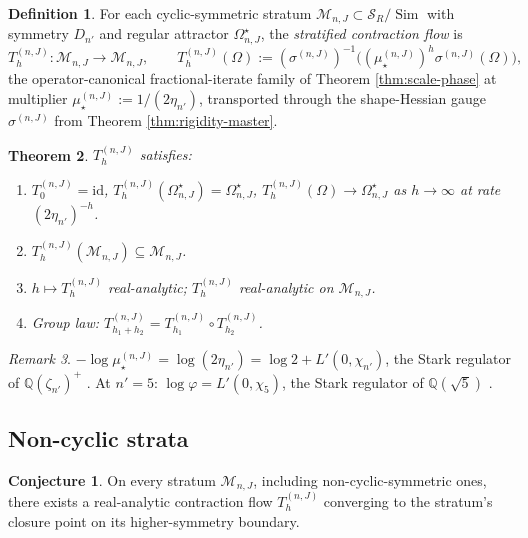\documentclass[11pt,reqno]{amsart}
\theoremstyle{plain}
\newtheorem{theorem}{Theorem}[section]
\theoremstyle{definition}
\newtheorem{definition}[theorem]{Definition}
\newtheorem*{conjecture}{Conjecture}
\theoremstyle{remark}
\newtheorem{remark}[theorem]{Remark}
\DeclareMathOperator{\Sim}{Sim}
\newcommand{\Rats}{\mathbb{Q}}
\newcommand{\Scal}{\mathcal{S}}
\newcommand{\Mcal}{\mathcal{M}}
\newcommand{\mustar}{\mu_{\star}}
\begin{document}
\begin{definition}\label{def:Th-master}
For each cyclic-symmetric stratum $\Mcal_{n,J} \subset \Scal_R/\Sim$ with symmetry $D_{n'}$ and regular attractor $\Omega^\star_{n,J}$, the \emph{stratified contraction flow} is
\[
T_h^{(n,J)} \colon \Mcal_{n,J} \to \Mcal_{n,J}, \qquad T_h^{(n,J)}(\Omega) := (\sigma^{(n,J)})^{-1}\bigl((\mustar^{(n,J)})^h \sigma^{(n,J)}(\Omega)\bigr),
\]
the operator-canonical fractional-iterate family of Theorem \ref{thm:scale-phase} at multiplier $\mustar^{(n,J)} := 1/(2\eta_{n'})$, transported through the shape-Hessian gauge $\sigma^{(n,J)}$ from Theorem \ref{thm:rigidity-master}.
\end{definition}

\begin{theorem}\label{thm:flow-master}
$T_h^{(n,J)}$ satisfies:
\begin{enumerate}
\item[\rm(i)] $T_0^{(n,J)} = \mathrm{id}$, $T_h^{(n,J)}(\Omega^\star_{n,J}) = \Omega^\star_{n,J}$, $T_h^{(n,J)}(\Omega) \to \Omega^\star_{n,J}$ as $h \to \infty$ at rate $(2\eta_{n'})^{-h}$.
\item[\rm(ii)] $T_h^{(n,J)}(\Mcal_{n,J}) \subseteq \Mcal_{n,J}$.
\item[\rm(iii)] $h \mapsto T_h^{(n,J)}$ real-analytic; $T_h^{(n,J)}$ real-analytic on $\Mcal_{n,J}$.
\item[\rm(iv)] Group law: $T_{h_1+h_2}^{(n,J)} = T_{h_1}^{(n,J)} \circ T_{h_2}^{(n,J)}$.
\end{enumerate}
\end{theorem}

\begin{remark}\label{rem:stark-master}
$-\log\mustar^{(n,J)} = \log(2\eta_{n'}) = \log 2 + L'(0, \chi_{n'})$, the Stark regulator of $\Rats(\zeta_{n'})^+$ \cite{Stark}. At $n' = 5$: $\log\varphi = L'(0, \chi_5)$, the Stark regulator of $\Rats(\sqrt 5)$ \cite{ChowlaSelberg}.
\end{remark}

\subsection{Non-cyclic strata}\label{ss:non-cyclic-master}

\begin{conjecture}
On every stratum $\Mcal_{n,J}$, including non-cyclic-symmetric ones, there exists a real-analytic contraction flow $T_h^{(n,J)}$ converging to the stratum's closure point on its higher-symmetry boundary.
\end{conjecture}
\end{document}

